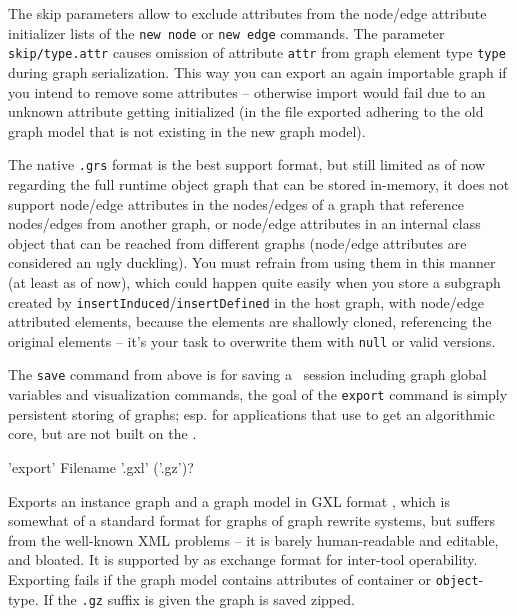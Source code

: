 The skip parameters allow to exclude attributes from the node/edge attribute initializer lists of the \texttt{new node} or \texttt{new edge} commands.
The parameter \texttt{skip/type.attr} causes omission of attribute \texttt{attr} from graph element type \texttt{type} during graph serialization.
This way you can export an again importable graph if you intend to remove some attributes -- otherwise import would fail due to an unknown attribute getting initialized (in the file exported adhering to the old graph model that is not existing in the new graph model).

The native \texttt{.grs} format is the best support format, but still limited as of now regarding the full runtime object graph that can be stored in-memory, it does not support node/edge attributes in the nodes/edges of a graph that reference nodes/edges from another graph, or node/edge attributes in an internal class object that can be reached from different graphs (node/edge attributes are considered an ugly duckling). You must refrain from using them in this manner (at least as of now), which could happen quite easily when you store a subgraph created by \texttt{insertInduced}/\texttt{insertDefined} in the host graph, with node/edge attributed elements, because the elements are shallowly cloned, referencing the original elements -- it's your task to overwrite them with \texttt{null} or valid versions.

The \texttt{save} command from above is for saving a \GrShell\ session including graph global variables and visualization commands,
the goal of the \texttt{export} command is simply persistent storing of graphs;
esp. for applications that use \GrG{ }to get an algorithmic core, but are not built on the \GrShell.

\begin{rail}
  'export' Filename '.gxl' ('.gz')?
\end{rail}
Exports an instance graph and a graph model in GXL format \cite{GXL,GXL2},
which is somewhat of a standard format for graphs of graph rewrite systems,
but suffers from the well-known XML problems -- it is barely human-readable and editable, and bloated.
It is supported by \GrG{} as exchange format for inter-tool operability.
Exporting fails if the graph model contains attributes of container or \texttt{object}-type.
If the \texttt{.gz} suffix is given the graph is saved zipped.

